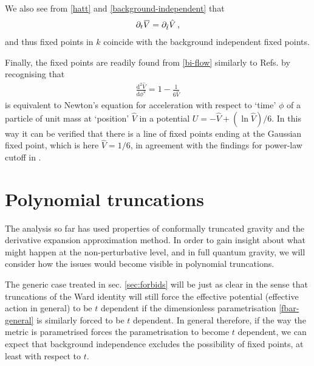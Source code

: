 \documentclass[11pt]{book}
\newcommand{\overbar}[1]{\mkern 1.5mu\overline{\mkern-1.5mu#1\mkern-1.5mu}\mkern 1.5mu}
\newcommand{\bV}{\overbar V}
\newcommand{\hV}{\hat V}
\newcommand{\hatt}{\hat t}
\numberwithin{equation}{chapter}
\begin{document}
We also see from \eqref{hatt} and \eqref{background-independent} that
\begin{align}
  \partial_t \bV = \partial_{\hatt} \hV\,,
\end{align}
and thus fixed points in $k$ coincide with the background independent fixed points.

Finally, the fixed points are readily found from \eqref{bi-flow} similarly to Refs.
\cite{Dietz:2016gzg,Morris:1994jc} by recognising that
\begin{align}
  \frac{\mathrm d^2\hV}{\mathrm d\phi^2} = 1-\frac{1}{6\hV}
\end{align}
is equivalent to Newton's equation for acceleration with respect to `time' $\phi$ of a particle
of unit mass at `position' $\hV$ in a potential $U=-\hV+ (\ln\hV)/6$.
In this way it can be verified that there is a line of fixed points ending at the Gaussian fixed point,
which is here $\hV=1/6$, in agreement with the findings for power-law cutoff in \cite{Dietz:2016gzg}.


\section{Polynomial truncations}
\label{sec:truncations}

The analysis  so far has used properties of conformally truncated gravity and the derivative
expansion approximation method. In order to gain insight about what might happen at the non-perturbative level,
and in full quantum gravity, we will consider how the issues would become visible in polynomial truncations.

The generic case treated in sec. \ref{sec:forbids} will be just as clear in the sense that truncations
of the Ward identity will still force the effective potential (effective action in general) to be
$t$ dependent if the dimensionless parametrisation \eqref{fbar-general} is similarly forced to be $t$ dependent.
In general therefore, if the way the metric is parametrised forces the parametrisation to become $t$ dependent,
we can expect that background independence excludes the possibility of fixed points,
at least with respect to $t$.
\end{document}
